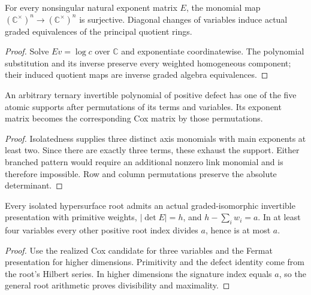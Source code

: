 \begin{theorem}
\label{thm:diagonal}
\leanok
For every nonsingular natural exponent matrix $E$, the monomial map $(\mathbb C^\times)^n\to(\mathbb C^\times)^n$ is surjective. Diagonal changes of variables induce actual graded equivalences of the principal quotient rings.
\end{theorem}
\begin{proof}
\leanok
{}
Solve $Ev=\log c$ over $\mathbb C$ and exponentiate coordinatewise. The polynomial substitution and its inverse preserve every weighted homogeneous component; their induced quotient maps are inverse graded algebra equivalences.
\end{proof}

\begin{theorem}
\label{thm:invertible-support}
\leanok
An arbitrary ternary invertible polynomial of positive defect has one of the five atomic supports after permutations of its terms and variables. Its exponent matrix becomes the corresponding Cox matrix by those permutations.
\end{theorem}
\begin{proof}
\leanok
{}
Isolatedness supplies three distinct axis monomials with main exponents at least two. Since there are exactly three terms, these exhaust the support. Either branched pattern would require an additional nonzero link monomial and is therefore impossible. Row and column permutations preserve the absolute determinant.
\end{proof}

\begin{theorem}
\label{thm:principal-presentation}
\leanok
Every isolated hypersurface root admits an actual graded-isomorphic invertible presentation with primitive weights, $|\det E|=h$, and $h-\sum_i w_i=a$. In at least four variables every other positive root index divides $a$, hence is at most $a$.
\end{theorem}
\begin{proof}
\leanok
{}
Use the realized Cox candidate for three variables and the Fermat presentation for higher dimensions. Primitivity and the defect identity come from the root's Hilbert series. In higher dimensions the signature index equals $a$, so the general root arithmetic proves divisibility and maximality.
\end{proof}

